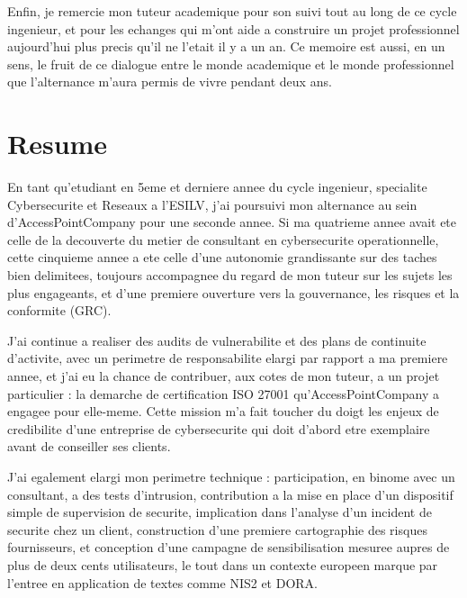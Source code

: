 \documentclass[11pt,a4paper]{article}
\begin{document}
Enfin, je remercie mon tuteur academique pour son suivi tout au long de ce cycle ingenieur, et pour les echanges qui m'ont aide a construire un projet professionnel aujourd'hui plus precis qu'il ne l'etait il y a un an. Ce memoire est aussi, en un sens, le fruit de ce dialogue entre le monde academique et le monde professionnel que l'alternance m'aura permis de vivre pendant deux ans.

\newpage

\section*{Resume}

En tant qu'etudiant en 5eme et derniere annee du cycle ingenieur, specialite Cybersecurite et Reseaux a l'ESILV, j'ai poursuivi mon alternance au sein d'AccessPointCompany pour une seconde annee. Si ma quatrieme annee avait ete celle de la decouverte du metier de consultant en cybersecurite operationnelle, cette cinquieme annee a ete celle d'une autonomie grandissante sur des taches bien delimitees, toujours accompagnee du regard de mon tuteur sur les sujets les plus engageants, et d'une premiere ouverture vers la gouvernance, les risques et la conformite (GRC).

J'ai continue a realiser des audits de vulnerabilite et des plans de continuite d'activite, avec un perimetre de responsabilite elargi par rapport a ma premiere annee, et j'ai eu la chance de contribuer, aux cotes de mon tuteur, a un projet particulier : la demarche de certification ISO 27001 qu'AccessPointCompany a engagee pour elle-meme. Cette mission m'a fait toucher du doigt les enjeux de credibilite d'une entreprise de cybersecurite qui doit d'abord etre exemplaire avant de conseiller ses clients.

J'ai egalement elargi mon perimetre technique : participation, en binome avec un consultant, a des tests d'intrusion, contribution a la mise en place d'un dispositif simple de supervision de securite, implication dans l'analyse d'un incident de securite chez un client, construction d'une premiere cartographie des risques fournisseurs, et conception d'une campagne de sensibilisation mesuree aupres de plus de deux cents utilisateurs, le tout dans un contexte europeen marque par l'entree en application de textes comme NIS2 et DORA.
\end{document}
